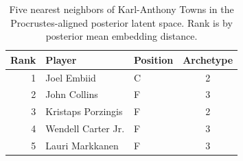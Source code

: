 \begin{table}[htbp]
  \centering\small
  \begin{tabular}{rllc}
    \toprule
    Rank & Player & Position & Archetype \\
    \midrule
    1 & Joel Embiid & C & 2 \\
    2 & John Collins & F & 3 \\
    3 & Kristaps Porzingis & F & 2 \\
    4 & Wendell Carter Jr. & F & 3 \\
    5 & Lauri Markkanen & F & 3 \\
    \bottomrule
  \end{tabular}
  \caption{Five nearest neighbors of Karl-Anthony Towns in the Procrustes-aligned posterior latent space. Rank is by posterior mean embedding distance.}
  \label{tab:Karl_Anthony_Towns_neighbors}
\end{table}

